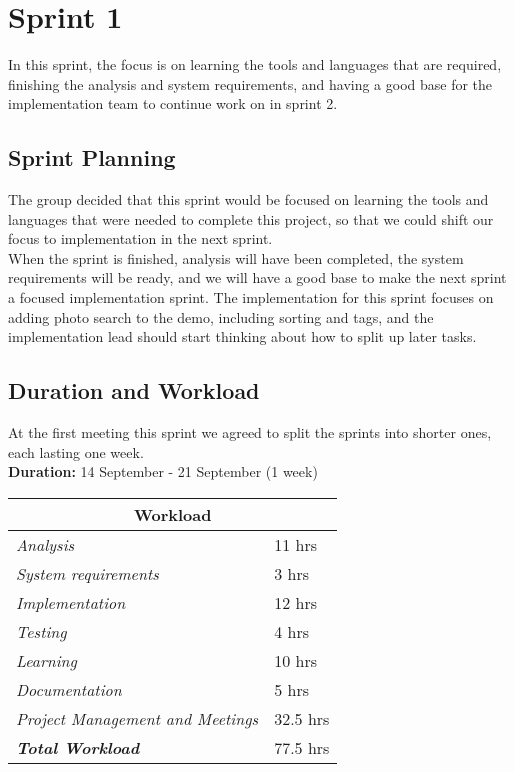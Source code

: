\chapter{Sprint 1}
In this sprint, the focus is on learning the tools and languages that are required, finishing the analysis and system requirements, and having a good base for the implementation team to continue work on in sprint 2.

\section{Sprint Planning}
The group decided that this sprint would be focused on learning the tools and languages that were needed to complete this project, so that we could shift our focus to implementation in the next sprint. \\
\indent When the sprint is finished, analysis will have been completed, the system requirements will be ready, and we will have a good base to make the next sprint a focused implementation sprint. The implementation for this sprint focuses on adding photo search to the demo, including sorting and tags, and the implementation lead should start thinking about how to split up later tasks.

\section{Duration and Workload}
At the first meeting this sprint we agreed to split the sprints into shorter ones, each lasting one week. \\

\noindent \textbf{Duration: } 14 September - 21 September (1 week)\\
\begin{minipage}{\linewidth}
\setlength{\tabcolsep}{25pt}
\centering
{}
\begin{tabular}{ |l|l| }
	\hline
	\multicolumn{2}{|c|}{\cellcolor{gray!25} Workload} \\
	\hline
	\it{Analysis} & 11 hrs\\
	\it{System requirements} & 3 hrs\\
	\it{Implementation} & 12 hrs\\
	\it{Testing} & 4 hrs\\
	\it{Learning} & 10 hrs\\
	\it{Documentation} & 5 hrs\\
	\it{Project Management and Meetings} & 32.5 hrs\\
	\hline
	\textbf{\textit{Total Workload}} & 77.5 hrs\\
	\hline
\end{tabular}
\end{minipage}


